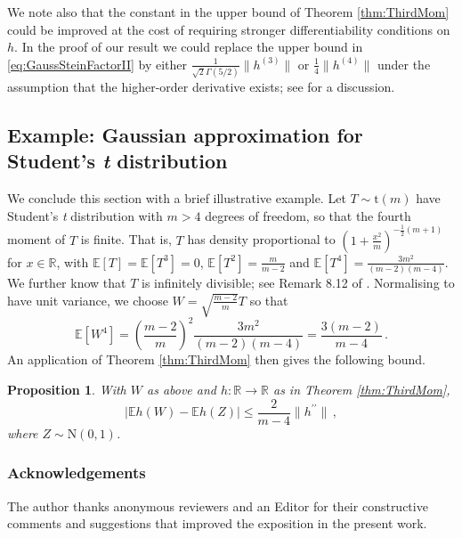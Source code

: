 \documentclass[12pt]{article}
\newtheorem{proposition}[theorem]{Proposition}
\begin{document}
We note also that the constant in the upper bound of Theorem \ref{thm:ThirdMom} could be improved at the cost of requiring stronger differentiability conditions on $h$. In the proof of our result we could replace the upper bound in \eqref{eq:GaussSteinFactorII} by either $\frac{1}{\sqrt{2}\Gamma(5/2)}\lVert h^{(3)}\rVert$ or $\frac{1}{4}\lVert h^{(4)}\rVert$ under the assumption that the higher-order derivative exists; see \cite{gaunt25} for a discussion.

\subsection{Example: Gaussian approximation for Student's \emph{t} distribution}

We conclude this section with a brief illustrative example. Let $T\sim\text{t}(m)$ have Student's \emph{t} distribution with $m>4$ degrees of freedom, so that the fourth moment of $T$ is finite. That is, $T$ has density proportional to $(1+\frac{x^2}{m})^{-\frac{1}{2}(m+1)}$ for $x\in\mathbb{R}$, with $\mathbb{E}[T]=\mathbb{E}[T^3]=0$, $\mathbb{E}[T^2]=\frac{m}{m-2}$ and $\mathbb{E}[T^4]=\frac{3m^2}{(m-2)(m-4)}$. We further know that $T$ is infinitely divisible; see Remark 8.12 of \cite{sato99}. Normalising to have unit variance, we choose $W=\sqrt{\frac{m-2}{m}}T$ so that
\[
\mathbb{E}[W^4]=\left(\frac{m-2}{m}\right)^2\frac{3m^2}{(m-2)(m-4)}=\frac{3(m-2)}{m-4}\,.
\]
An application of Theorem \ref{thm:ThirdMom} then gives the following bound.
\begin{proposition}
With $W$ as above and $h:\mathbb{R}\to\mathbb{R}$ as in Theorem \ref{thm:ThirdMom},
\[
|\mathbb{E}h(W)-\mathbb{E}h(Z)|\leq\frac{2}{m-4}\lVert h^{\prime\prime}\rVert\,,
\]
where $Z\sim\text{N}(0,1)$.
\end{proposition}

\subsubsection*{Acknowledgements}
The author thanks anonymous reviewers and an Editor for their constructive comments and suggestions that improved the exposition in the present work.
\end{document}
